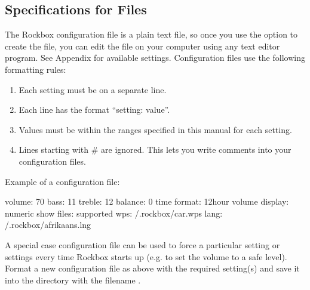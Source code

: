 \subsection{\label{ref:cfg_specs}Specifications for  Files}

The Rockbox configuration file is a plain text file, so once you use the
 option to create the file, you can edit the file on
your computer using any text editor program. See
Appendix  for available settings. Configuration
files use the following formatting rules: %

\begin{enumerate}
\item Each setting must be on a separate line.
\item Each line has the format ``setting: value''.
\item Values must be within the ranges specified in this manual for each
  setting.
\item Lines starting with \# are ignored. This lets you write comments into
  your configuration files.
\end{enumerate}

Example of a configuration file:
\begin{example}
    volume: 70
    bass: 11
    treble: 12
    balance: 0
    time format: 12hour
    volume display: numeric
    show files: supported
    wps: /.rockbox/car.wps
    lang: /.rockbox/afrikaans.lng
\end{example}


  A special case configuration file can be used to force a particular setting
  or settings every time Rockbox starts up (e.g. to set the volume to a safe
  level). Format a new configuration file as above with the required setting(s)
  and save it into the  directory with the filename
  .

